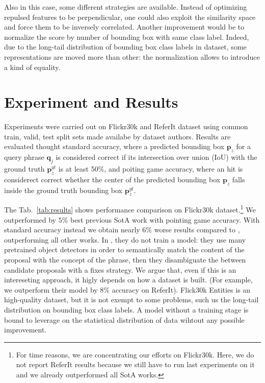 \documentclass{article}
\begin{document}
Also in this case, some different strategies are available. Instead of
optimizing repulsed features to be perpendicular, one could also
exploit the similarity space and force them to be inversely
correlated. Another improvement would be to normalize the score by
number of bounding box with same class label. Indeed, due to the
long-tail distribution of bounding box class labels in dataset, some
representations are moved more than other: the normalization allows to
introduce a kind of equality.

\section{Experiment and Results}

Experiments were carried out on Flickr30k and ReferIt dataset using
common train, valid, test split sets made availabe by dataset authors.
Results are evaluated thought standard accuracy, where a predicted
bounding box $\bm{p}_z$ for a query phrase $\bm{q}_j$ is considered
correct if its intersection over union (IoU) with the ground truth
$\bm{p}^{gt}_z$ is at least 50\%, and poiting game accuracy, where an
hit is considerect correct whether the center of the predicted
bounding box $\bm{p}_z$ falls inside the ground truth bounding box
$\bm{p}^{gt}_z$.

The Tab.~\ref{tab:results} shows performance comparison on Flickr30k
dataset.\footnote{For time reasons, we are concentrating our efforts
on Flickr30k. Here, we do not report ReferIt results because we still
have to run last experiments on it and we already outperformed all
SotA works.} We outperformed by $5$\% best previous SotA work with
pointing game accuracy. With standard accuracy instead we obtain
nearly $6$\% worse results compared to \cite{wang2019phrase},
outperforming all other works. In \cite{wang2019phrase}, they do not
train a model: they use many pretrained object detectors in order to
semantically match the content of the proposal with the concept of the
phrase, then they disambiguate the between candidate proposals with a
fixes strategy. We argue that, even if this is an intereseting
approach, it higly depends on how a dataset is built. (For example, we
outperform their model by $8$\% accuracy on ReferIt). Flick30k
Entities is an high-quality dataset, but it is not exempt to some
problems, such us the long-tail distribution on bounding box class
labels. A model without a training stage is bound to leverage on the
statistical distribution of data wihtout any possible improvement.
\end{document}
